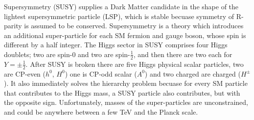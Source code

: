 %











Supersymmetry (SUSY)
supplies a Dark Matter candidate in the shape of the lightest supersymmetric
particle (LSP),
which is stable becuase symmetry of R-parity is assumed to be conserved.
Supersymmetry is a theory which introduces an additional super-particle for each SM fermion and
gauge boson, whose spin is different by a half integer.
The Higgs sector in SUSY comprises four Higgs doublets; two are spin-0 and two are spin-$\tfrac12$,
and then there are two each for $Y=\pm\tfrac12$.
After SUSY is broken there are five Higgs physical scalar particles, two are CP-even ($h^0$,
$H^0$) one is CP-odd scalar ($A^0$) and two charged are charged ($H^\pm$).
It also immediately solves the hierarchy problem becuase for every SM particle that contributes to
the Higgs mass, a SUSY particle also contributes, but with the opposite sign.
Unfortunately, masses of the super-particles are unconstrained, and could be anywhere between a few
TeV and the Planck scale.

